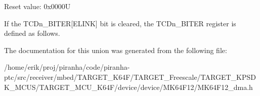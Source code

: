 Reset value\+: 0x0000U

If the T\+C\+Dn\+\_\+\+B\+I\+T\+ER\mbox{[}E\+L\+I\+NK\mbox{]} bit is cleared, the T\+C\+Dn\+\_\+\+B\+I\+T\+ER register is defined as follows. 

The documentation for this union was generated from the following file\+:\begin{DoxyCompactItemize}
\item 
/home/erik/proj/piranha/code/piranha-\/ptc/src/receiver/mbed/\+T\+A\+R\+G\+E\+T\+\_\+\+K64\+F/\+T\+A\+R\+G\+E\+T\+\_\+\+Freescale/\+T\+A\+R\+G\+E\+T\+\_\+\+K\+P\+S\+D\+K\+\_\+\+M\+C\+U\+S/\+T\+A\+R\+G\+E\+T\+\_\+\+M\+C\+U\+\_\+\+K64\+F/device/device/\+M\+K64\+F12/M\+K64\+F12\+\_\+dma.\+h\end{DoxyCompactItemize}
